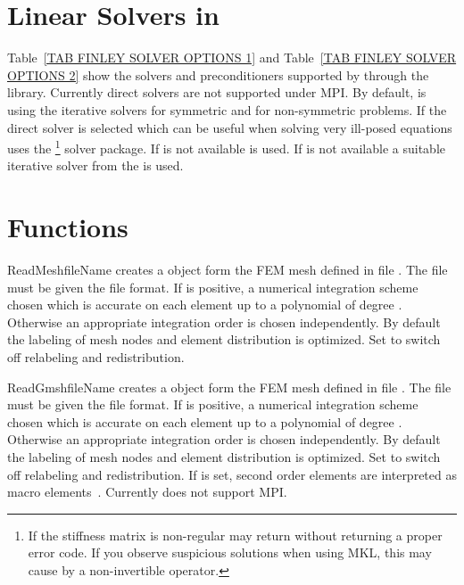 \section{Linear Solvers in \SolverOptions}
Table~\ref{TAB FINLEY SOLVER OPTIONS 1} and
Table~\ref{TAB FINLEY SOLVER OPTIONS 2} show the solvers and preconditioners supported by
\finley through the \PASO library. Currently direct solvers are not supported under MPI.
By default, \finley is using the iterative solvers \PCG for symmetric and \BiCGStab for non-symmetric problems.
If the direct solver is selected which can be useful when solving very ill-posed equations
\finley uses the \MKL \footnote{If the stiffness matrix is non-regular \MKL may return without
returning a proper error code. If you observe suspicious solutions when using MKL, this may cause by a non-invertible operator. } solver package. If \MKL is not available \UMFPACK is used. If \UMFPACK is not available
a suitable iterative solver from the \PASO is used.

\section{Functions}
\begin{funcdesc}{ReadMesh}{fileName }
creates a \Domain object form the FEM mesh defined in
file . The file must be given the \finley file format.
If  is positive, a numerical integration scheme
chosen which is accurate on each element up to a polynomial of
degree  . Otherwise
an appropriate integration order is chosen independently.
By default the labeling of mesh nodes and element distribution is
optimized. Set  to switch off relabeling and redistribution.
\end{funcdesc}

\begin{funcdesc}{ReadGmsh}{fileName }
creates a \Domain object form the FEM mesh defined in
file . The file must be given the \gmshextern file format.
If  is positive, a numerical integration scheme
chosen which is accurate on each element up to a polynomial of
degree  . Otherwise
an appropriate integration order is chosen independently.
By default the labeling of mesh nodes and element distribution is
optimized. Set  to switch off relabeling and redistribution.
If  is set, second order elements are interpreted as macro elements~.
Currently  does not support MPI.
\end{funcdesc}

